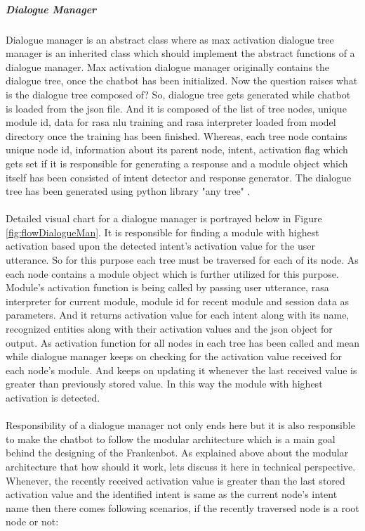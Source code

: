 \subparagraph*{Dialogue Manager} Dialogue manager is an abstract class where as max activation dialogue tree manager is an inherited class which should implement the abstract functions of a dialogue manager. Max activation dialogue manager originally contains the dialogue tree, once the chatbot has been initialized. Now the question raises what is the dialogue tree composed of? So, dialogue tree gets generated while chatbot is loaded from the json file. And it is composed of the list of tree nodes, unique module id, data for rasa nlu training and rasa interpreter loaded from model directory once the training has been finished. Whereas, each tree node contains unique node id, information about its parent node,  intent, activation flag which gets set if it is responsible for generating a response and a module object which itself has been consisted of intent detector and response generator. The dialogue tree has been generated using python library "any tree" \cite{anytree}.
\\~\\
Detailed visual chart for a dialogue manager is portrayed below in Figure \ref{fig:flowDialogueMan}. It is responsible for finding a module with highest activation based upon the detected intent's activation value for the user utterance. So for this purpose each tree must be traversed for each of its node. As each node contains a module object which is further utilized for this purpose. Module's activation function is being called by passing user utterance, rasa interpreter for current module, module id for recent module and session data as parameters. And it returns activation value for each intent along with its name, recognized entities along with their activation values and the json object for output. As activation function for all nodes in each tree has been called and mean while dialogue manager keeps on checking for the activation value received for each node's module. And keeps on updating it whenever the last received value is greater than previously stored value. In this way the module with highest activation is detected.
\\~\\
Responsibility of a dialogue manager not only ends here but it is also responsible to make the chatbot to follow the modular architecture which is a main goal behind the designing of the Frankenbot. As explained above about the modular architecture that how should it work, lets discuss it here in technical perspective. Whenever, the recently received activation value is greater than the last stored activation value and the identified intent is same as the current node's intent name then there comes following scenarios, if the recently traversed node is a root node or not: 
